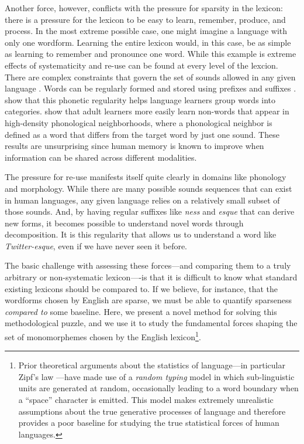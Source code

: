 \documentclass{article}
\begin{document}
Another force, however, conflicts with the pressure for sparsity in the lexicon: there is a pressure for the
lexicon to be easy to learn, remember, produce, and process. In the most extreme possible case, one might
imagine a language with only one wordform. Learning the entire lexicon would, in this case, be as simple as
learning to remember and pronounce one word. While this example is extreme effects of systematicity and re-use
can be found at every level of the lexcion. There are complex constraints that govern the set of sounds
allowed in any given language \citep{hayes_blick_2012}. Words can be regularly formed and stored using
prefixes and suffixes \citep{odonnell_productivity_2011}. \cite{monaghan_arbitrariness_2011} show that this
phonetic regularity helps language learners group words into categories. \cite{storkel_differentiating_2006}
show that adult learners more easily learn non-words that appear in high-density phonological neighborhoods,
where a phonological neighbor is defined as a word that differs from the target word by just one sound. These
results are unsurprising since human memory is known to improve when information can be shared across
different modalities.

The pressure for re-use manifests itself quite clearly in domains like phonology and morphology. While there
are many possible sounds sequences that can exist in human languages, any given language relies on a
relatively small subset of those sounds. And, by having regular suffixes like \textit{ness} and \textit{esque}
that can derive new forms, it becomes possible to understand novel words through decomposition. It is this
regularity that allows us to understand a word like \textit{Twitter-esque}, even if we have never seen it
before.

The basic challenge with assessing these forces---and comparing them to a truly arbitrary or non-systematic
lexicon----is that it is difficult to know what standard existing lexicons should be compared to. If we
believe, for instance, that the wordforms chosen by English are sparse, we must be able to quantify sparseness
\emph{compared to} some baseline. Here, we present a novel method for solving this methodological puzzle, and
we use it to study the fundamental forces shaping the set of monomorphemes chosen by the English
lexicon\footnote{Prior theoretical arguments about the statistics of language---in particular Zipf's law
\cite{mandelbrot_informational,miller1957some}---have made use of a \emph{random typing} model in which
sub-linguistic units are generated at random, occasionally leading to a word boundary when a ``space''
character is emitted. This model makes extremely unrealistic assumptions about the true generative processes
of language \cite{howes1968zipf,piantadosi2012information} and therefore provides a poor baseline for studying
the true statistical forces of human languages.}.
\end{document}
